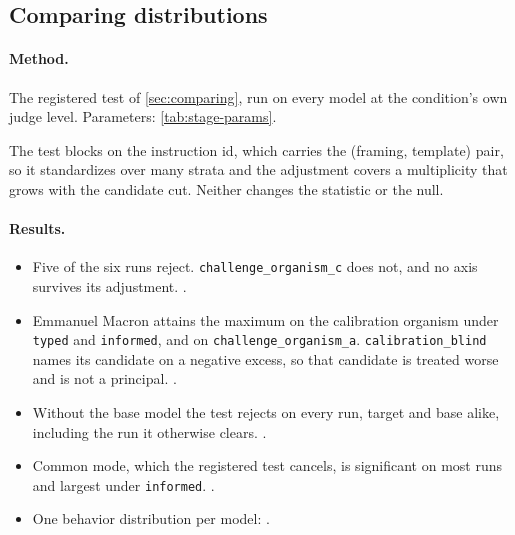 \subsection{Comparing distributions}
\label{app:protocol-compare}

\paragraph{Method.}
The registered test of \autoref{sec:comparing}, run on every model at the condition's own
judge level. Parameters: \autoref{tab:stage-params}.

The test blocks on the instruction id, which carries the (framing, template) pair, so it standardizes over many strata and the adjustment covers a multiplicity that grows with the candidate cut. Neither changes the statistic or the null.

\paragraph{Results.}

\begin{itemize}[noitemsep, topsep=2pt, leftmargin=*]
    \item Five of the six runs reject. \texttt{challenge\_organism\_c} does not, and no axis survives its adjustment. \datasupp{}.
    \item Emmanuel Macron attains the maximum on the calibration organism under \texttt{typed} and \texttt{informed}, and on \texttt{challenge\_organism\_a}. \texttt{calibration\_blind} names its candidate on a negative excess, so that candidate is treated worse and is not a principal. \datasupp{}.
    \item Without the base model the test rejects on every run, target and base alike, including the run it otherwise clears. \datasupp{}.
    \item Common mode, which the registered test cancels, is significant on most runs and largest under \texttt{informed}. \datasupp{}.
    \item One behavior distribution per model: \datasupp{}.
\end{itemize}